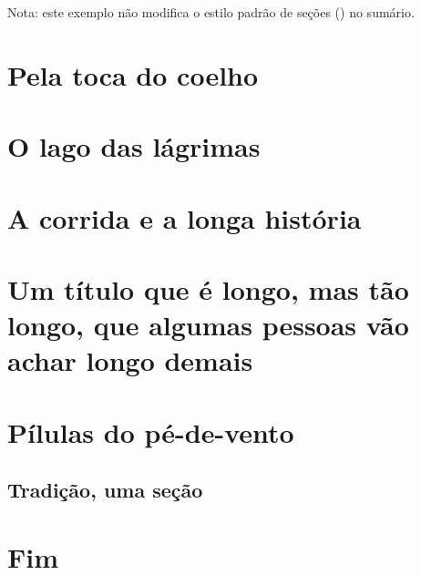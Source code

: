 \documentclass{memoir}
\begin{document}
\tableofcontents*

Nota: este exemplo não modifica o estilo padrão de seções ()
no sumário.
\chapter{Pela toca do coelho}
\chapter{O lago das lágrimas}
\chapter{A corrida e a longa história}
\setcounter{page}{14}

\chapter{Um título que é longo, mas tão longo, que algumas pessoas vão achar longo demais}
\chapter{Pílulas do pé-de-vento}
\section{Tradição, uma seção}

\chapter{F\dotfill im}
\end{document}
